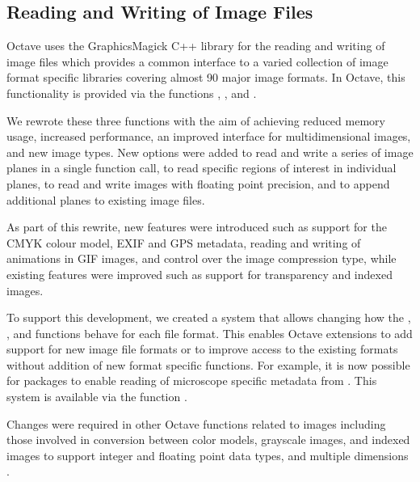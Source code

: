 \subsection{Reading and Writing of Image Files}

Octave uses the GraphicsMagick C++ library for the reading and writing
of image files which provides a common interface
to a varied collection of
image format specific libraries covering almost
90 major image formats.  In Octave, this functionality is
provided via the functions , , and
.

We rewrote these three functions with the aim of achieving
reduced memory usage, increased performance, an improved
interface for multidimensional images, and new image types.
New options were added to read and write a series of image planes
in a single function call, to read specific regions of interest in
individual planes, to read and write images
with floating point precision, and to append additional planes to existing image
files.

As part of this rewrite, new features were introduced such as
support for the CMYK colour model, EXIF
and GPS metadata, reading and writing of animations in GIF images, and
control over the image compression type,
while existing features were improved such as
support for transparency and
indexed images.

To support this development, we created a system that allows changing
how the , , and 
functions behave for each file format.
This enables Octave extensions to add support for new image file
formats or to improve access to the existing formats
without addition of new format specific functions.
For example, it is now possible for packages to enable reading of
microscope specific metadata from .
This system is available via the function .

Changes were required in other Octave functions related to images
including those involved in conversion between color
models, grayscale images, and indexed images to support integer and
floating point data types, and multiple dimensions
.

